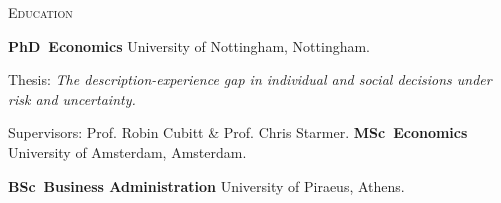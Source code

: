 \begin{rubric}{\textsc{Education}}

\entry*[2014 -- 2019]%
	\textbf{PhD~Economics} University of Nottingham, Nottingham.
	\par Thesis: \emph{The description-experience gap in individual and social decisions under risk and uncertainty.}
	\par Supervisors: Prof. Robin Cubitt \& Prof. Chris Starmer.
%
\entry*[2012 -- 2013]%
	\textbf{MSc~Economics} University of Amsterdam, Amsterdam.

\entry*[2004 -- 2009]%
	\textbf{BSc~Business Administration} University of Piraeus, Athens.

\end{rubric}
